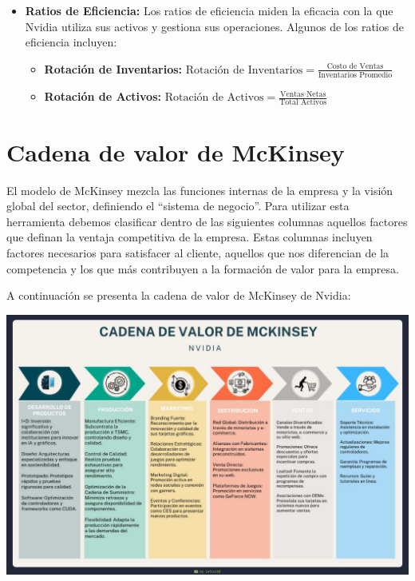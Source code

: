 \documentclass{article}
\begin{document}
\begin{itemize}
  \item \textbf{Ratios de Eficiencia:} Los ratios de eficiencia miden la eficacia con la que Nvidia utiliza sus activos y gestiona sus operaciones. Algunos de los ratios de eficiencia incluyen:
  \begin{itemize}
    \item \textbf{Rotación de Inventarios:} \(\text{Rotación de Inventarios} = \frac{\text{Costo de Ventas}}{\text{Inventarios Promedio}}\)
    \item \textbf{Rotación de Activos:} \(\text{Rotación de Activos} = \frac{\text{Ventas Netas}}{\text{Total Activos}}\)
  \end{itemize}
  
\end{itemize}

\section{Cadena de valor de McKinsey}

El modelo de McKinsey mezcla las funciones internas de la empresa y la visión global del sector, definiendo el “sistema de negocio”. Para utilizar esta herramienta debemos clasificar dentro de las siguientes columnas aquellos factores que definan la ventaja competitiva de la empresa. Estas columnas incluyen factores necesarios para satisfacer al cliente, aquellos que nos diferencian de la competencia y los que más contribuyen a la formación de valor para la empresa.

A continuación se presenta la cadena de valor de McKinsey de Nvidia:

\begin{center}
  \includegraphics[width=15cm]{./assets/mckenzy.png}
\end{center}
\end{document}
